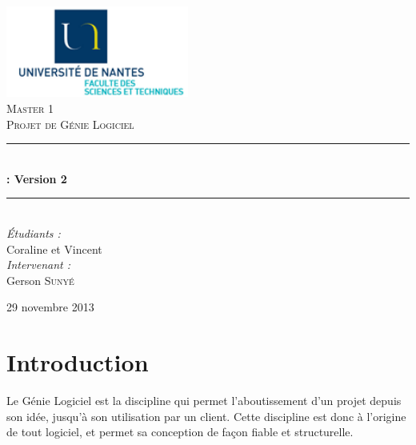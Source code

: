 \documentclass[a4paper, 12pt]{report}
\newcommand{\HRule}{\rule{\linewidth}{0.5mm}}
\begin{document}
	\begin{titlepage}
		\begin{center}

			\includegraphics[width=0.45\textwidth]{UN-sciences.png}~\\[2cm]

			\textsc{\LARGE Master 1 }\\[1.5cm]

			\textsc{\Large Projet de Génie Logiciel}\\[0.5cm]

			\HRule \\[0.4cm]
			{ \huge \bfseries {} : Version 2 \\[0.4cm] }
			\HRule \\[1.5cm]

			\emph{\'Etudiants :}\\
			Coraline  et Vincent \\
			\vspace{0.5cm}
			\emph{Intervenant :} \\
			Gerson \textsc{Sunyé}
		
			\vfill

			{\large 29 novembre 2013}

		\end{center}
	\end{titlepage}

	\renewcommand{\contentsname}{Sommaire}
	\tableofcontents
	\newpage
	
	\chapter*{Introduction}
	
	Le Génie Logiciel est la discipline qui permet l’aboutissement d’un projet depuis son idée, jusqu’à son utilisation par un client. Cette discipline est donc à l’origine de tout logiciel, et permet sa conception de façon fiable et structurelle.
\end{document}
